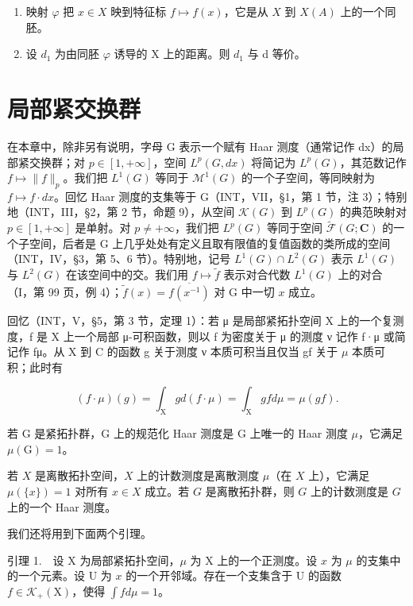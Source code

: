 \begin{enumerate}
\def\labelenumi{\alph{enumi})}
\setcounter{enumi}{4}
\item
  映射 \(\varphi\) 把 \(x \in X\) 映到特征标 \(f \mapsto f(x)\)，它是从 \(X\) 到 \(X(A)\) 上的一个同胚。
\item
  设 \(d_{1}\) 为由同胚 \(\varphi\) 诱导的 X 上的距离。则 \(d_{1}\) 与 d 等价。
\end{enumerate}

\chapter{局部紧交换群}

在本章中，除非另有说明，字母 G 表示一个赋有 Haar 测度（通常记作 dx）的局部紧交换群；对 \(p \in [1, +\infty]\)，空间 \(L^{p}(G, dx)\) 将简记为 \(L^{p}(G)\)，其范数记作 \(f \mapsto \|f\|_{p}\)。我们把 \(L^{1}(G)\) 等同于 \(\mathcal{M}^{1}(G)\) 的一个子空间，等同映射为 \(f \mapsto f \cdot dx\)。回忆 Haar 测度的支集等于 G（INT，VII，§1，第 1 节，注 3）；特别地（INT，III，§2，第 2 节，命题 9），从空间 \(\mathcal{K}(G)\) 到 \(L^{p}(G)\) 的典范映射对 \(p \in [1, +\infty]\) 是单射。对 \(p \neq +\infty\)，我们把 \(L^{p}(G)\) 等同于空间 \(\widetilde{\mathcal{F}}(G; \mathbf{C})\) 的一个子空间，后者是 G 上几乎处处有定义且取有限值的复值函数的类所成的空间（INT，IV，§3，第 5、6 节）。特别地，记号 \(L^{1}(G) \cap L^{2}(G)\) 表示 \(L^{1}(G)\) 与 \(L^{2}(G)\) 在该空间中的交。我们用 \(f \mapsto \widetilde{f}\) 表示对合代数 \(L^{1}(G)\) 上的对合（I，第 99 页，例 4）；\(\widetilde{f}(x) = \overline{f(x^{-1})}\) 对 G 中一切 \(x\) 成立。

回忆（INT，V，§5，第 3 节，定理 1）：若 μ 是局部紧拓扑空间 X 上的一个复测度，f 是 X 上一个局部 μ-可积函数，则以 f 为密度关于 μ 的测度 ν 记作 f·μ 或简记作 fμ。从 X 到 C 的函数 g 关于测度 ν 本质可积当且仅当 gf 关于 \(\mu\) 本质可积；此时有

\[
(f \cdot \mu) (g) = \int_ {\mathrm{X}} g d (f \cdot \mu) = \int_ {\mathrm{X}} g f d \mu = \mu (g f).
\]

若 G 是紧拓扑群，G 上的规范化 Haar 测度是 G 上唯一的 Haar 测度 \(\mu\)，它满足 \(\mu(\mathrm{G}) = 1\)。

若 \(X\) 是离散拓扑空间，\(X\) 上的计数测度是离散测度 \(\mu\)（在 \(X\) 上），它满足 \(\mu(\{x\}) = 1\) 对所有 \(x \in X\) 成立。若 \(G\) 是离散拓扑群，则 \(G\) 上的计数测度是 \(G\) 上的一个 Haar 测度。

我们还将用到下面两个引理。

引理 1.　设 X 为局部紧拓扑空间，\(\mu\) 为 X 上的一个正测度。设 \(x\) 为 \(\mu\) 的支集中的一个元素。设 U 为 \(x\) 的一个开邻域。存在一个支集含于 U 的函数 \(f \in \mathcal{K}_{+}(\mathrm{X})\)，使得 \(\int fd\mu = 1\)。

